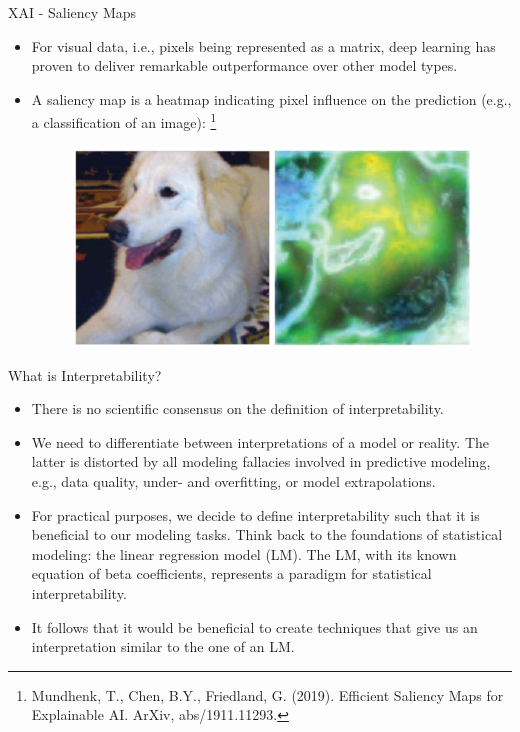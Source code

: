 \documentclass[11pt,compress,t,notes=noshow, xcolor=table]{beamer}
\begin{document}
\begin{vbframe}{XAI - Saliency Maps}

\begin{itemize}
\item For visual data, i.e., pixels being represented as a matrix, deep learning has proven to deliver remarkable outperformance over other model types.
\item A saliency map is a heatmap indicating pixel influence on the prediction (e.g., a classification of an image): \footnote[frame]{Mundhenk, T., Chen, B.Y., Friedland, G. (2019). Efficient Saliency Maps for Explainable AI. ArXiv, abs/1911.11293.
}

\begin{figure}
\includegraphics[width = 0.8 \textwidth]{figure/saliencymap}
\end{figure}
\end{itemize}
\end{vbframe}

\begin{vbframe}{What is Interpretability?}
\begin{itemize}
\itemsep1em
\item There is no scientific consensus on the definition of interpretability.
\item We need to differentiate between interpretations of a model or reality. The latter is distorted by all modeling fallacies involved in predictive modeling, e.g., data quality, under- and overfitting, or model extrapolations. 
\item For practical purposes, we decide to define interpretability such that it is beneficial to our modeling tasks. Think back to the foundations of statistical modeling:  the linear regression model (LM). The LM, with its known equation of beta coefficients, represents a paradigm for statistical interpretability.
\item It follows that it would be beneficial to create techniques that give us an interpretation similar to the one of an LM.
\end{itemize}
\end{vbframe}
\end{document}
